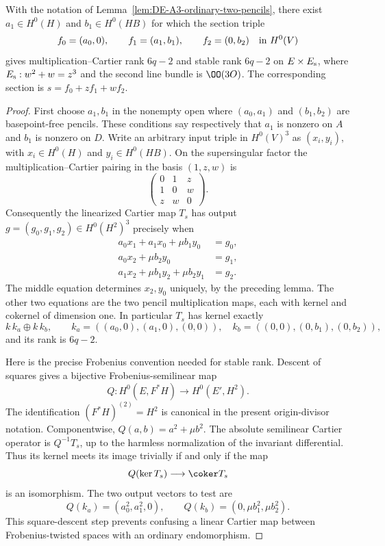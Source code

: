 \begin{lemma}
\label{lem:DE-A3-mixed-residue-determinant}
With the notation of Lemma~\ref{lem:DE-A3-ordinary-two-pencils},
there exist $a_1\in H^0(H)$ and $b_1\in H^0(HB)$ for which the
section triple
\[
 f_0=(a_0,0),\qquad f_1=(a_1,b_1),\qquad f_2=(0,b_2)
 \quad\hbox{in }H^0(V)
\]
gives multiplication--Cartier rank $6q-2$ and stable rank $6q-2$
on $E\times E_{\rm s}$, where
$E_{\rm s}:w^2+w=z^3$ and the second line bundle is $\OO(3O)$.
The corresponding section is $s=f_0+zf_1+wf_2$.
\end{lemma}
\begin{proof}
First choose $a_1,b_1$ in the nonempty open where
$(a_0,a_1)$ and $(b_1,b_2)$ are basepoint-free pencils.
These conditions say respectively that $a_1$ is nonzero on $A$
and $b_1$ is nonzero on $D$.
Write an arbitrary input triple in $H^0(V)^3$ as
$(x_i,y_i)$, with $x_i\in H^0(H)$ and $y_i\in H^0(HB)$.
On the supersingular factor the multiplication--Cartier pairing
in the basis $(1,z,w)$ is
\[
 \begin{pmatrix}0&1&z\\1&0&w\\z&w&0\end{pmatrix}.
\]
Consequently the linearized Cartier map $T_s$ has output
$g=(g_0,g_1,g_2)\in H^0(H^2)^3$ precisely when
\begin{align}
 a_0x_1+a_1x_0+\mu b_1y_0&=g_0,\label{eq:DE-residue-C0}\\
 a_0x_2+\mu b_2y_0&=g_1,\label{eq:DE-residue-C1}\\
 a_1x_2+\mu b_1y_2+\mu b_2y_1&=g_2.\label{eq:DE-residue-C2}
\end{align}
The middle equation determines $x_2,y_0$ uniquely, by the preceding
lemma.  The other two equations are the two pencil multiplication
maps, each with kernel and cokernel of dimension one.
In particular $T_s$ has kernel exactly
\[
 k\,k_a\oplus k\,k_b,\qquad
 k_a=((a_0,0),(a_1,0),(0,0)),\quad
 k_b=((0,0),(0,b_1),(0,b_2)),
\]
and its rank is $6q-2$.

Here is the precise Frobenius convention needed for stable rank.
Descent of squares gives a bijective Frobenius-semilinear map
\[
 Q:H^0(E,F^*H)\longrightarrow H^0(E',H^2).
\]
The identification $(F^*H)^{(2)}=H^2$ is canonical in the present
origin-divisor notation.  Componentwise,
$Q(a,b)=a^2+\mu b^2$.
The absolute semilinear Cartier operator is $Q^{-1}T_s$,
up to the harmless normalization of the invariant differential.
Thus its kernel meets its image trivially if and only if the map
\[
 Q(\ker T_s)\longrightarrow\coker T_s
\]
is an isomorphism.  The two output vectors to test are
\[
 Q(k_a)=(a_0^2,a_1^2,0),\qquad
 Q(k_b)=(0,\mu b_1^2,\mu b_2^2).
\]
This square-descent step prevents confusing a linear Cartier map
between Frobenius-twisted spaces with an ordinary endomorphism.


\end{proof}

